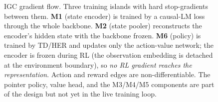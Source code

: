 \documentclass[11pt]{article}
\begin{document}
\begin{figure}[h]
\caption{IGC gradient flow. Three training islands with hard stop-gradients between them. \textbf{M1}
(state encoder) is trained by a causal-LM loss through the whole backbone. \textbf{M2} (state pooler)
reconstructs the encoder's hidden state with the backbone frozen. \textbf{M6} (policy) is trained by
TD/HER and updates only the action-value network; the encoder is frozen during RL (the observation
embedding is detached at the environment boundary), so \emph{no RL gradient reaches the
representation}. Action and reward edges are non-differentiable. The pointer policy, value head, and
the M3/M4/M5 components are part of the design but not yet in the live training loop.}
\label{fig:igc-gradflow}
\end{figure}
\end{document}
